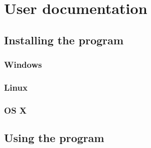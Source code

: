 \section{User documentation}
\subsection{Installing the program}
\subsubsection{Windows}
\subsubsection{Linux}
\subsubsection{OS X}
\subsection{Using the program}
